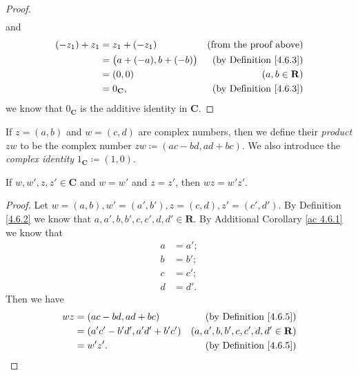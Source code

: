\begin{proof}
\begin{align*}
    \end{align*}
    and
    \begin{align*}
        (-z_1) + z_1 & = z_1 + (-z_1)                 & \text{(from the proof above)}      \\
                     & = \big(a + (-a), b + (-b)\big) & \text{(by Definition \ref{4.6.3})} \\
                     & = (0, 0)                       & (a, b \in \mathbf{R})              \\
                     & = 0_{\mathbf{C}},              & \text{(by Definition \ref{4.6.3})}
    \end{align*}
    we know that \(0_{\mathbf{C}}\) is the additive identity in \(\mathbf{C}\).
\end{proof}

\begin{definition}\label{4.6.5}
    If \(z = (a, b)\) and \(w = (c, d)\) are complex numbers, then we define their \emph{product} \(zw\) to be the complex number \(zw \coloneqq (ac - bd, ad + bc)\).
    We also introduce the \emph{complex identity} \(1_{\mathbf{C}} \coloneqq (1, 0)\).
\end{definition}

\begin{additional corollary}\label{ac 4.6.3}
If \(w, w', z, z' \in \mathbf{C}\) and \(w = w'\) and \(z = z'\), then \(wz = w'z'\).
\end{additional corollary}

\begin{proof}
    Let \(w = (a, b), w' = (a', b'), z = (c, d), z' = (c', d')\).
    By Definition \ref{4.6.2} we know that \(a, a', b, b', c, c', d, d' \in \mathbf{R}\).
    By Additional Corollary \ref{ac 4.6.1} we know that
    \begin{align*}
        a & = a'; \\
        b & = b'; \\
        c & = c'; \\
        d & = d'.
    \end{align*}
    Then we have
    \begin{align*}
        wz & = (ac - bd, ad + bc)             & \text{(by Definition \ref{4.6.5})}          \\
           & = (a' c' - b' d', a' d' + b' c') & (a, a', b, b', c, c', d, d' \in \mathbf{R}) \\
           & = w' z'.                         & \text{(by Definition \ref{4.6.5})}
    \end{align*}
\end{proof}

